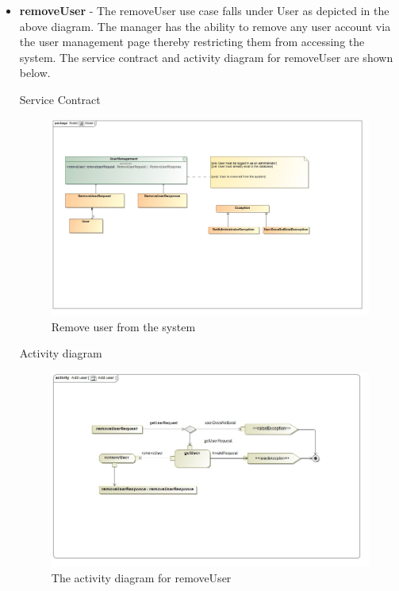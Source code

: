 \documentclass[english]{article}
\begin{document}
\begin{itemize}
\begin{figure}[H]
	  			\end{figure}
	  		
	  			
			\item \textbf{removeUser} - The removeUser use case falls under User as depicted in the above diagram. The manager has the ability to remove any user account via the user management page thereby restricting them from accessing the system. The service contract and activity diagram for removeUser are shown below.
			\newpage
			\begin{center}
				Service Contract
			\end{center}
			
			\begin{figure}[H]
				\begin{center}
					\includegraphics[scale=0.25]{removeUserlContract.jpg}
				\end{center}
				\caption{Remove user from the system}
				
			\end{figure}
			
			
			\begin{center}
				Activity diagram
			\end{center}
			
			\begin{figure}[H]
				\begin{center}
					\includegraphics[scale=0.3]{RemoveUser1.jpg}
				\end{center}
				\caption{The activity diagram for removeUser}
				
			\end{figure}
		\end{itemize}		
		
\end{document}
